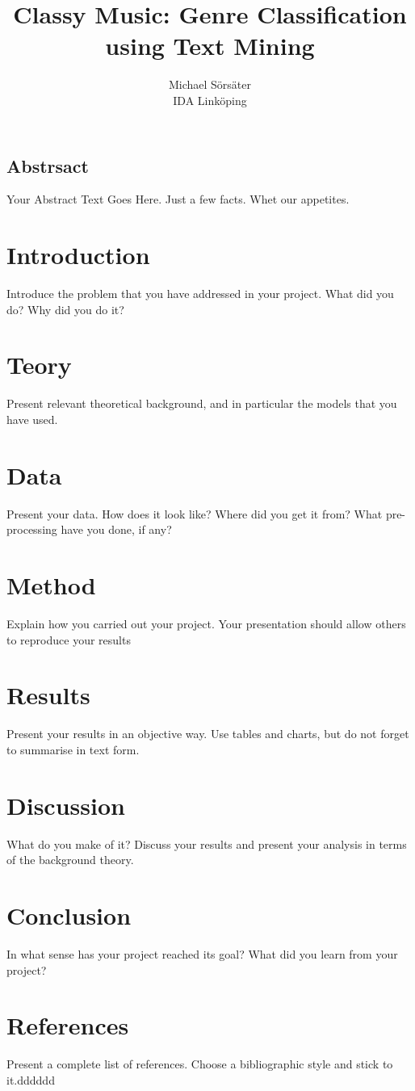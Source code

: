 \documentclass[a4paper, 12pt]{article}
\begin{document}
\date{}

\title{\Large Classy Music: Genre Classification using Text Mining}

\author{
{Michael Sörsäter}\\
IDA Linköping
}

\maketitle


\subsection*{Abstrsact}
Your Abstract Text Goes Here.  Just a few facts.
Whet our appetites.

\section{Introduction}
Introduce the problem that you have addressed in
your project. What did you do? Why did you do it?
\section{Teory}
Present relevant theoretical background, and in particular
the models that you have used.
\section{Data}
Present your data. How does it look like? Where did you get
it from? What pre-processing have you done, if any?
\section{Method}
Explain how you carried out your project. Your
presentation should allow others to reproduce your results

\section{Results}
Present your results in an objective way. Use tables and
charts, but do not forget to summarise in text form.
\section{Discussion}
What do you make of it? Discuss your results and
present your analysis in terms of the background theory. \cite{Tsaptsinos2017}
\section{Conclusion}
In what sense has your project reached its goal? What
did you learn from your project?
\cite{Canicatti}
\section*{References}
Present a complete list of references. Choose a
bibliographic style and stick to it.dddddd




\end{document}
